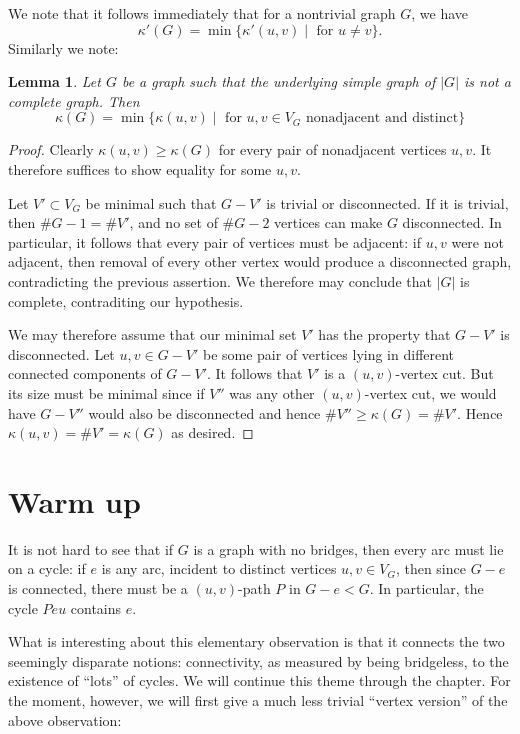 \documentclass[12pt]{report}
\theoremstyle{plain}
\newtheorem{lem}[thm]{Lemma}
\begin{document}
We note that it follows immediately that for a nontrivial graph $G$, we
have 
\[\kappa'(G) = \min\{\kappa'(u, v) \mid \text{ for $u \neq v$} \}.\]
Similarly we note:
\begin{lem}
Let $G$ be a graph such that the underlying simple graph of $|G|$ is not a
complete graph. Then 
\[\kappa(G) = \min\{\kappa(u,v) \mid \text{ for $u, v \in V_G$ nonadjacent
and distinct}\}\]
\end{lem}
\begin{proof}
Clearly $\kappa(u, v) \geq \kappa(G)$ for every pair of nonadjacent
vertices $u, v$. It therefore suffices to show equality for some $u, v$.

Let $V' \subset V_G$ be minimal such that $G - V'$ is trivial or
disconnected. If it is trivial, then $\#G  - 1 = \#V'$, and no set of $\#G
- 2$ vertices can make $G$ disconnected. In particular, it follows that
every pair of vertices must be adjacent: if $u, v$ were not adjacent, then
removal of every other vertex would produce a disconnected graph,
contradicting the previous assertion. We therefore may conclude that $|G|$
is complete, contraditing our hypothesis.

We may therefore assume that our minimal set $V'$ has the property that $G
- V'$ is disconnected. Let $u, v \in G - V'$ be some pair of vertices lying
in different connected components of $G - V'$. It follows that $V'$ is a
$(u, v)$-vertex cut. But its size must be minimal since if $V''$ was any
other $(u, v)$-vertex cut, we would have $G - V''$ would also be
disconnected and hence $\#V'' \geq \kappa(G) = \#V'$. Hence $\kappa(u,v) =
\#V' =\kappa(G)$ as desired.
\end{proof}

\section{Warm up}

It is not hard to see that if $G$ is a graph with no bridges, then every
arc must lie on a cycle: if $e$ is any arc, incident to distinct vertices
$u, v \in V_G$, then since $G - e$ is connected, there must be a
$(u,v)$-path $P$ in $G - e < G$. In particular, the cycle $Peu$ contains
$e$.

What is interesting about this elementary observation is that it connects
the two seemingly disparate notions: connectivity, as measured by being
bridgeless, to the existence of ``lots'' of cycles. We will continue this
theme through the chapter. For the moment, however, we will first give a
much less trivial ``vertex version'' of the above observation:
\end{document}
